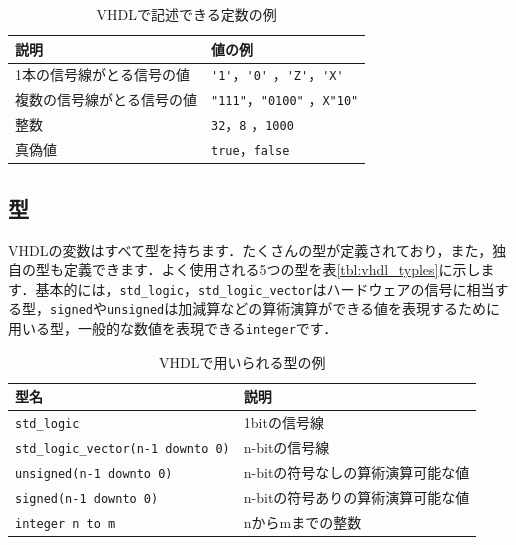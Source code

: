 \documentclass[a4paper,dvipdfmx]{jsarticle}
\begin{document}
\begin{table}[H]
\begin{center}
 \begin{tabular}{l|l}
 \hline
  説明                       & 値の例 \\\hline\hline
  1本の信号線がとる信号の値  & \verb|'1'|，\verb|'0'| ，\verb|'Z'|，\verb|'X'|  \\\hline
  複数の信号線がとる信号の値 & \verb|"111"|，\verb|"0100"| ，\verb|X"10"| \\\hline
  整数                       & \verb|32|，\verb|8| ，\verb|1000| \\\hline
  真偽値                     & \verb|true|，\verb|false|\\\hline
 \end{tabular}
\end{center}
\caption{VHDLで記述できる定数の例\label{tbl:vhdl_constants}}
\end{table}


\subsection{型}
VHDLの変数はすべて型を持ちます．たくさんの型が定義されており，また，独自の型も定義できます．よく使用される5つの型を表\ref{tbl:vhdl_typles}に示します．基本的には，\verb|std_logic|，\verb|std_logic_vector|はハードウェアの信号に相当する型，\verb|signed|や\verb|unsigned|は加減算などの算術演算ができる値を表現するために用いる型，一般的な数値を表現できる\verb|integer|です．

\begin{table}[H]
\begin{center}
 \begin{tabular}{l|l}
 \hline
  型名                                  & 説明 \\\hline\hline
  \verb|std_logic|                      & 1bitの信号線     \\\hline
  \verb|std_logic_vector(n-1 downto 0)| & n-bitの信号線    \\\hline
  \verb|unsigned(n-1 downto 0)|         & n-bitの符号なしの算術演算可能な値 \\\hline
  \verb|signed(n-1 downto 0)|           & n-bitの符号ありの算術演算可能な値 \\\hline
  \verb|integer n to m|                 & nからmまでの整数 \\\hline
 \end{tabular}
\end{center}
\caption{VHDLで用いられる型の例\label{tbl:vhdl_types}}
\end{table}
\end{document}
